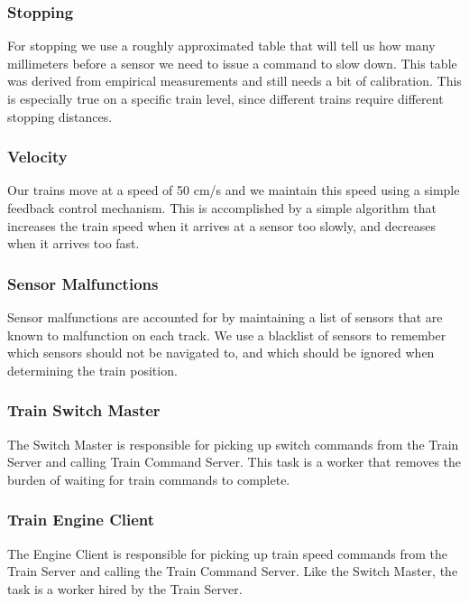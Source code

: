 \documentclass[letterpaper]{article}
\begin{document}
\subsubsection{Stopping%
  \label{stopping}%
}

For stopping we use a roughly approximated table that will tell us how many millimeters before a sensor we need to issue a command to slow down.  This table was derived from empirical measurements and still needs a bit of calibration.  This is especially true on a specific train level, since different trains require different stopping distances.


\subsubsection{Velocity%
  \label{velocity}%
}

Our trains move at a speed of 50 cm/s and we maintain this speed using a simple feedback control mechanism.  This is accomplished by a simple algorithm that increases the train speed when it arrives at a sensor too slowly, and decreases when it arrives too fast.


\subsubsection{Sensor Malfunctions%
  \label{sensor-malfunctions}%
}

Sensor malfunctions are accounted for by maintaining a list of sensors that are known to malfunction on each track.  We use a blacklist of sensors to remember which sensors should not be navigated to, and which should be ignored when determining the train position.


\subsubsection{Train Switch Master%
  \label{train-switch-master}%
}

The Switch Master is responsible for picking up switch commands from the Train Server and calling Train Command Server. This task is a worker that removes the burden of waiting for train commands to complete.


\subsubsection{Train Engine Client%
  \label{train-engine-client}%
}

The Engine Client is responsible for picking up train speed commands from the Train Server and calling the Train Command Server. Like the Switch Master, the task is a worker hired by the Train Server.
\end{document}
